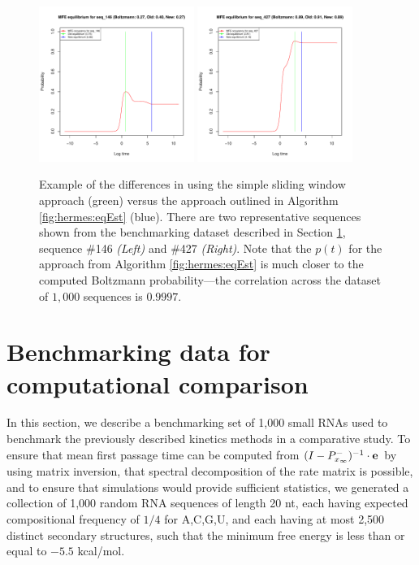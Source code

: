 \begin{figure}[!ht]
\centering
\includegraphics[width=0.45\textwidth]{Figures/Hermes/eqEstFromRnaEqSeq146.pdf}
\quad
\includegraphics[width=0.45\textwidth]{Figures/Hermes/eqEstFromRnaEqSeq427.pdf}
\caption{Example of the differences in using the simple sliding window
approach (green) versus the approach outlined in Algorithm \ref{fig:hermes:eqEst}
(blue). There are two representative sequences shown from the benchmarking
dataset described in Section \ref{sec:hermes:benchdata}, sequence \#146
{\em (Left)} and \#427 {\em (Right)}. Note that the $p(t)$ for the approach from
Algorithm \ref{fig:hermes:eqEst} is much closer to the computed Boltzmann
probability---the correlation across the dataset of $1,000$ sequences is
$0.9997$.}
\label{fig:hermes:eqEstFromRnaEq}
\end{figure}

\section{Benchmarking data for computational comparison}
\label{sec:hermes:benchdata}

In this section, we describe a
benchmarking set of 1,000 small RNAs used to benchmark the previously
described kinetics methods in a comparative study. To ensure that mean
first passage time can be computed from
$(I - P^{-}_{x_\infty})^{-1} \cdot {\bf e}$ by using matrix
inversion, that spectral decomposition of the rate matrix is possible,
and to ensure that \kinfold simulations would provide sufficient
statistics, we generated a collection of 1,000 random RNA sequences of
length 20 nt, each having expected compositional frequency of $1/4$
for A,C,G,U, and each having at most 2,500 distinct secondary
structures, such that the minimum free energy is less than or equal to
$-5.5$ kcal/mol.

